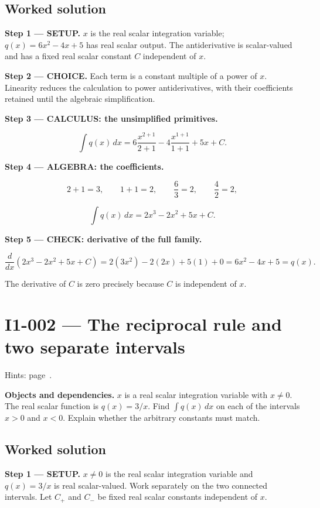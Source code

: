 \documentclass[11pt,oneside,openany]{book}
\begin{document}
\subsection*{Worked solution}

\textbf{Step 1 --- SETUP.} \(x\) is the real scalar integration variable;
\(q(x)=6x^2-4x+5\) has real scalar output. The antiderivative is scalar-valued
and has a fixed real scalar constant \(C\) independent of \(x\).

\begin{ChoiceStep}
\textbf{Step 2 --- CHOICE.} Each term is a constant multiple of a power of \(x\).
Linearity reduces the calculation to power antiderivatives, with their
coefficients retained until the algebraic simplification.

\end{ChoiceStep}
\textbf{Step 3 --- CALCULUS: the unsimplified primitives.}

\[
\int q(x)\,dx
=6\frac{x^{2+1}}{2+1}-4\frac{x^{1+1}}{1+1}+5x+C.
\]

\begingroup\color{AlgebraBlue}
\textbf{Step 4 --- ALGEBRA: the coefficients.}

\[
2+1=3,\qquad 1+1=2,\qquad \frac63=2,\qquad \frac42=2,
\]

\[
\int q(x)\,dx=2x^3-2x^2+5x+C.
\]

\endgroup
\textbf{Step 5 --- CHECK: derivative of the full family.}

\[
\frac{d}{dx}\left(2x^3-2x^2+5x+C\right)
=2(3x^2)-2(2x)+5(1)+0=6x^2-4x+5=q(x).
\]

The derivative of \(C\) is zero precisely because \(C\) is independent of \(x\).
\clearpage
\section{I1-002 --- The reciprocal rule and two separate intervals}
\label{problem:I1-002}
{\small Hints: page~\pageref{hints:I1-002}.}\par\medskip

\textbf{Objects and dependencies.} \(x\) is a real scalar integration variable with
\(x\ne0\). The real scalar function is \(q(x)=3/x\). Find \(\int q(x)\,dx\) on each
of the intervals \(x>0\) and \(x<0\). Explain whether the arbitrary constants must match.
\subsection*{Worked solution}

\textbf{Step 1 --- SETUP.} \(x\ne0\) is the real scalar integration variable and
\(q(x)=3/x\) is real scalar-valued. Work separately on the two connected intervals.
Let \(C_+\) and \(C_-\) be fixed real scalar constants independent of \(x\).
\end{document}
